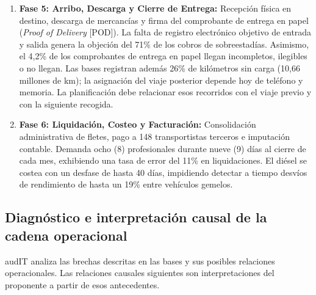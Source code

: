 \begin{enumerate}
  \item \textbf{Fase 5: Arribo, Descarga y Cierre de Entrega:} Recepción física en destino, descarga de mercancías y firma del comprobante de entrega en papel (\textit{Proof of Delivery} [POD]). La falta de registro electrónico objetivo de entrada y salida genera la objeción del 71\% de los cobros de sobreestadías. Asimismo, el 4,2\% de los comprobantes de entrega en papel llegan incompletos, ilegibles o no llegan. Las bases registran además 26\% de kilómetros sin carga (10,66 millones de km); la asignación del viaje posterior depende hoy de teléfono y memoria. La planificación debe relacionar esos recorridos con el viaje previo y con la siguiente recogida.
  \item \textbf{Fase 6: Liquidación, Costeo y Facturación:} Consolidación administrativa de fletes, pago a 148 transportistas terceros e imputación contable. Demanda ocho (8) profesionales durante nueve (9) días al cierre de cada mes, exhibiendo una tasa de error del 11\% en liquidaciones. El diésel se costea con un desfase de hasta 40 días, impidiendo detectar a tiempo desvíos de rendimiento de hasta un 19\% entre vehículos gemelos.
\end{enumerate}

\subsection{Diagnóstico e interpretación causal de la cadena operacional}\label{sec:2-diagnostico}

audIT analiza las brechas descritas en las bases y sus posibles relaciones operacionales. Las relaciones causales siguientes son interpretaciones del proponente a partir de esos antecedentes.

